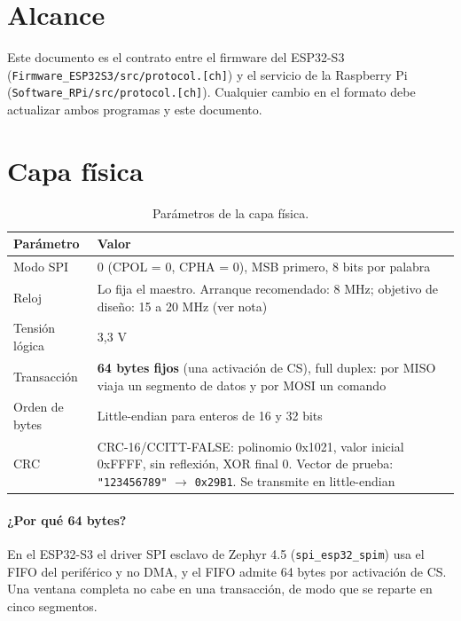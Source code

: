 \documentclass[12pt,a4paper]{article}
\begin{document}

\tableofcontents
\newpage

\section{Alcance}

Este documento es el contrato entre el firmware del ESP32-S3 (\texttt{Firmware\_ESP32S3/src/protocol.[ch]}) y el servicio de la Raspberry Pi (\texttt{Software\_RPi/src/protocol.[ch]}). Cualquier cambio en el formato debe actualizar ambos programas y este documento.

\section{Capa física}

\begin{table}[H]
\centering
\small
\begin{tabular}{@{}p{3.6cm} p{11.4cm}@{}}
\toprule
\textbf{Parámetro} & \textbf{Valor} \\
\midrule
Modo SPI & 0 (CPOL = 0, CPHA = 0), MSB primero, 8 bits por palabra \\
Reloj & Lo fija el maestro. Arranque recomendado: 8 MHz; objetivo de diseño: 15 a 20 MHz (ver nota) \\
Tensión lógica & 3{,}3 V \\
Transacción & \textbf{64 bytes fijos} (una activación de CS), full duplex: por MISO viaja un segmento de datos y por MOSI un comando \\
Orden de bytes & Little-endian para enteros de 16 y 32 bits \\
CRC & CRC-16/CCITT-FALSE: polinomio 0x1021, valor inicial 0xFFFF, sin reflexión, XOR final 0. Vector de prueba: \texttt{"123456789"} $\rightarrow$ \texttt{0x29B1}. Se transmite en little-endian \\
\bottomrule
\end{tabular}
\caption{Parámetros de la capa física.}
\end{table}

\paragraph{¿Por qué 64 bytes?} En el ESP32-S3 el driver SPI esclavo de Zephyr 4.5 (\texttt{spi\_esp32\_spim}) usa el FIFO del periférico y no DMA, y el FIFO admite 64 bytes por activación de CS. Una ventana completa no cabe en una transacción, de modo que se reparte en cinco segmentos.
\end{document}
